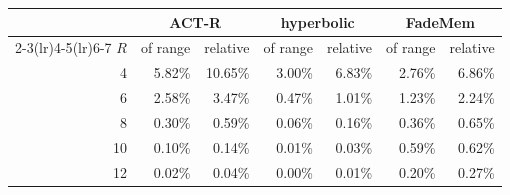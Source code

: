 \begin{tabular}{r rr rr rr}
\toprule
 & \multicolumn{2}{c}{ACT-R} & \multicolumn{2}{c}{hyperbolic} & \multicolumn{2}{c}{FadeMem}\\
\cmidrule(lr){2-3}\cmidrule(lr){4-5}\cmidrule(lr){6-7}
$R$ & of range & relative & of range & relative & of range & relative\\
\midrule
4 & 5.82\% & 10.65\% & 3.00\% & 6.83\% & 2.76\% & 6.86\%\\
6 & 2.58\% & 3.47\% & 0.47\% & 1.01\% & 1.23\% & 2.24\%\\
8 & 0.30\% & 0.59\% & 0.06\% & 0.16\% & 0.36\% & 0.65\%\\
10 & 0.10\% & 0.14\% & 0.01\% & 0.03\% & 0.59\% & 0.62\%\\
12 & 0.02\% & 0.04\% & 0.00\% & 0.01\% & 0.20\% & 0.27\%\\
\bottomrule
\end{tabular}
